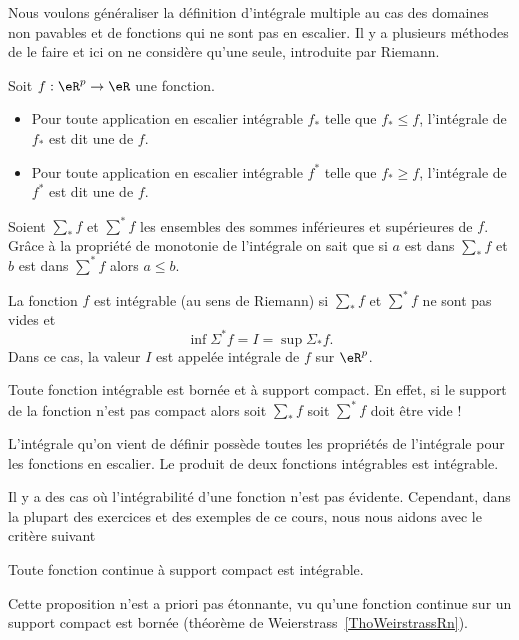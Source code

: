 Nous voulons généraliser la définition d'intégrale multiple au cas des domaines non pavables et de fonctions qui ne sont pas en escalier. Il y a plusieurs méthodes de le faire et ici on ne considère qu'une seule, introduite par Riemann.
\begin{definition} Soit $f: \eR^p\to \eR$ une fonction.
  \begin{itemize}
	  \item Pour toute application en escalier intégrable $f_*$ telle que $f_*\leq f$, l'intégrale de $f_*$ est dit une  de $f$.
	  \item Pour toute application en escalier intégrable $f^*$ telle que $f_*\geq f$, l'intégrale de $f^*$ est dit une  de $f$.
  \end{itemize}
\end{definition}
Soient $\sum_* f$ et  $\sum^* f$ les ensembles des sommes inférieures et supérieures de $f$. Grâce à la propriété de  monotonie de l'intégrale on sait que si $a$ est dans $\sum_* f$ et  $b$ est dans $\sum^* f$ alors $a\leq b$.
\begin{definition}
  La fonction $f$ est intégrable (au sens de Riemann) si $\sum_* f$ et  $\sum^* f$ ne sont pas vides et
\[
\inf \Sigma^* f=I =\sup \Sigma_* f.
\]
Dans ce cas, la valeur $I$ est appelée intégrale de $f$ sur $\eR^p$.
\end{definition}
\begin{remark}
  Toute fonction intégrable est bornée et à support compact. En effet, si le support de la  fonction n'est pas compact alors soit $\sum_* f$ soit $\sum^* f$ doit être vide !
\end{remark}
L'intégrale qu'on vient de définir possède toutes les propriétés de l'intégrale pour les fonctions en escalier. Le produit de deux fonctions intégrables est intégrable.

Il y a des cas où l'intégrabilité d'une fonction n'est pas évidente. Cependant, dans la plupart des exercices et des exemples de ce cours, nous nous aidons avec le critère suivant
\begin{proposition}
  Toute fonction continue à support compact est intégrable.
\end{proposition}
Cette proposition n'est a priori pas étonnante, vu qu'une fonction continue sur un support compact est bornée (théorème de Weierstrass~\ref{ThoWeirstrassRn}).

